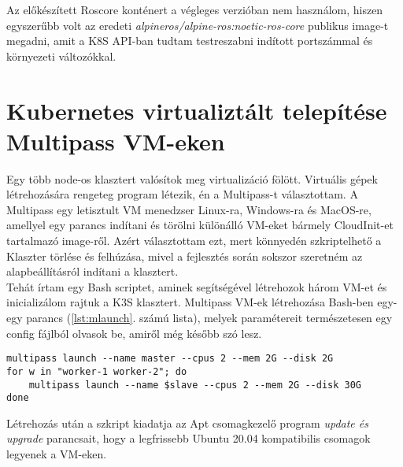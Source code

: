 \noindent
Az előkészített Roscore konténert a végleges verzióban nem használom, hiszen egyszerűbb volt az eredeti \emph{alpineros/alpine-ros:noetic-ros-core} publikus image-t megadni, amit a K8S API-ban tudtam testreszabni indított portszámmal és környezeti változókkal.

\section{Kubernetes virtualiztált telepítése Multipass VM-eken}

Egy több node-os klasztert valósítok meg virtualizáció fölött. Virtuális gépek létrehozására rengeteg program létezik, én a Multipass-t választottam. A Multipass egy letisztult VM menedzser Linux-ra, Windows-ra és MacOS-re, amellyel egy parancs indítani és törölni különálló VM-eket bármely CloudInit-et tartalmazó image-ről. Azért választottam ezt, mert könnyedén szkriptelhető a Klaszter törlése és felhúzása, mivel a fejlesztés során sokszor szeretném az alapbeállításról indítani a klasztert. \\

\noindent
Tehát írtam egy Bash scriptet, aminek segítségével létrehozok három VM-et és inicializálom rajtuk a K3S klasztert. Multipass VM-ek létrehozása Bash-ben egy-egy parancs (\ref{lst:mlaunch}. számú lista), melyek paramétereit természetesen egy config fájlból olvasok be, amiről még később szó lesz.
\begin{lstlisting}[caption={Multipass VM-ek létrehozása},label={lst:mlaunch}]
multipass launch --name master --cpus 2 --mem 2G --disk 2G
for w in "worker-1 worker-2"; do
	multipass launch --name $slave --cpus 2 --mem 2G --disk 30G
done
\end{lstlisting} 
\noindent
Létrehozás után a szkript kiadatja az Apt csomagkezelő program \emph{update és upgrade} parancsait, hogy a legfrissebb Ubuntu 20.04 kompatibilis csomagok legyenek a VM-eken. \\


